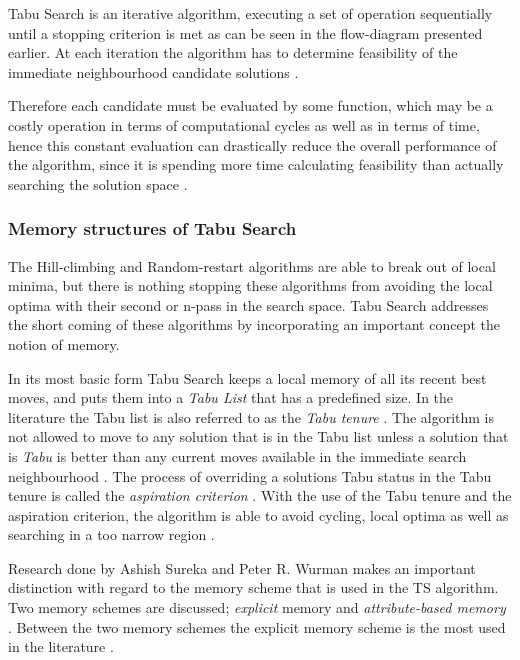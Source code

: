 Tabu Search is an iterative algorithm, executing a set of operation sequentially until a stopping criterion is met as can be seen in the flow-diagram presented earlier. At each iteration the algorithm has to determine feasibility of the immediate neighbourhood candidate solutions \cite{EvoParallelTabu,TabuVechicleRoutingWithTimeWindows}. 

Therefore each candidate must be evaluated by some function, which may be a costly operation in terms of computational cycles as well as in terms of time, hence this constant evaluation can drastically reduce the overall performance of the algorithm, since it is spending more time calculating feasibility than actually searching the solution space \cite{EvoParallelTabu,TabuVechicleRoutingWithTimeWindows}.

\subsubsection{Memory structures of Tabu Search}
The Hill-climbing and Random-restart algorithms are able to break out of local minima, but there is nothing stopping these algorithms from avoiding the local optima with their second or n-pass in the search space. Tabu Search addresses the short coming of these algorithms by incorporating an important concept the notion of memory.

In its most basic form Tabu Search keeps a local memory of all its recent best moves, and puts them into a \emph{Tabu List} that has a predefined size. In the literature the Tabu list is also referred to as the \emph{Tabu tenure} \cite{TSHazardous,TabuCarryOver,ReactiveTabuVHR,TabuParameterization}. The algorithm is not allowed to move to any solution that is in the Tabu list unless a solution that is \emph{Tabu} is better than any current moves available in the immediate search neighbourhood \cite{TSHazardous,TabuCarryOver,ReactiveTabuVHR,TabuParameterization}. The process of overriding a solutions Tabu status in the Tabu tenure is called the \emph{aspiration criterion} \cite{TSHazardous,TabuCarryOver,ReactiveTabuVHR,TabuParameterization}. With the use of the Tabu tenure and the aspiration criterion, the algorithm is able to avoid cycling, local optima as well as searching in a too narrow region \cite{TabuSingleMachineScheduling,CircuitTabu}.

Research done by Ashish Sureka and Peter R. Wurman makes an important distinction with regard to the memory scheme that is used in the TS algorithm. Two memory schemes are discussed; \emph{explicit} memory and \emph{attribute-based memory} \cite{TabuBiddingStrats,TabuFormGames}. Between the two memory schemes the explicit memory scheme is the most used in the literature \cite{TabuVechicleRoutingWithTimeWindows}.

